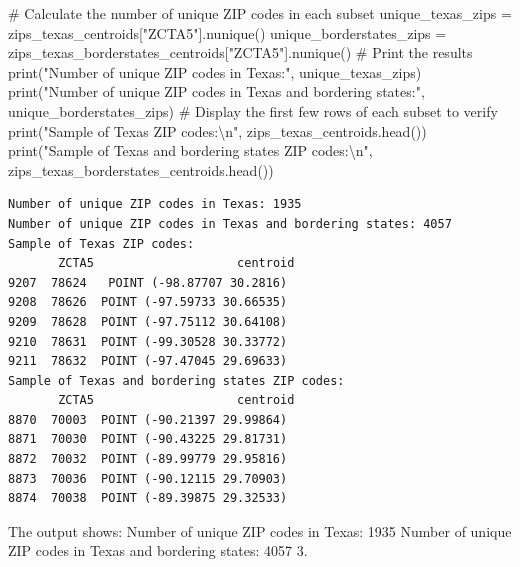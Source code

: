 \documentclass[
  letterpaper,
  DIV=11,
  numbers=noendperiod]{scrartcl}
\newenvironment{Shaded}{\begin{snugshade}}{\end{snugshade}}
\newcommand{\BuiltInTok}[1]{\textcolor[rgb]{0.00,0.23,0.31}{#1}}
\newcommand{\CharTok}[1]{\textcolor[rgb]{0.13,0.47,0.30}{#1}}
\newcommand{\CommentTok}[1]{\textcolor[rgb]{0.37,0.37,0.37}{#1}}
\newcommand{\NormalTok}[1]{\textcolor[rgb]{0.00,0.23,0.31}{#1}}
\newcommand{\OperatorTok}[1]{\textcolor[rgb]{0.37,0.37,0.37}{#1}}
\newcommand{\StringTok}[1]{\textcolor[rgb]{0.13,0.47,0.30}{#1}}
\begin{document}
\begin{Shaded}
\begin{Highlighting}[]
\CommentTok{\# Calculate the number of unique ZIP codes in each subset}
\NormalTok{unique\_texas\_zips }\OperatorTok{=}\NormalTok{ zips\_texas\_centroids[}\StringTok{"ZCTA5"}\NormalTok{].nunique()}
\NormalTok{unique\_borderstates\_zips }\OperatorTok{=}\NormalTok{ zips\_texas\_borderstates\_centroids[}\StringTok{"ZCTA5"}\NormalTok{].nunique()}
\CommentTok{\# Print the results}
\BuiltInTok{print}\NormalTok{(}\StringTok{"Number of unique ZIP codes in Texas:"}\NormalTok{, unique\_texas\_zips)}
\BuiltInTok{print}\NormalTok{(}\StringTok{"Number of unique ZIP codes in Texas and bordering states:"}\NormalTok{, unique\_borderstates\_zips)}
\CommentTok{\# Display the first few rows of each subset to verify}
\BuiltInTok{print}\NormalTok{(}\StringTok{"Sample of Texas ZIP codes:}\CharTok{\textbackslash{}n}\StringTok{"}\NormalTok{, zips\_texas\_centroids.head())}
\BuiltInTok{print}\NormalTok{(}\StringTok{"Sample of Texas and bordering states ZIP codes:}\CharTok{\textbackslash{}n}\StringTok{"}\NormalTok{, zips\_texas\_borderstates\_centroids.head())}
\end{Highlighting}
\end{Shaded}

\begin{verbatim}
Number of unique ZIP codes in Texas: 1935
Number of unique ZIP codes in Texas and bordering states: 4057
Sample of Texas ZIP codes:
       ZCTA5                    centroid
9207  78624   POINT (-98.87707 30.2816)
9208  78626  POINT (-97.59733 30.66535)
9209  78628  POINT (-97.75112 30.64108)
9210  78631  POINT (-99.30528 30.33772)
9211  78632  POINT (-97.47045 29.69633)
Sample of Texas and bordering states ZIP codes:
       ZCTA5                    centroid
8870  70003  POINT (-90.21397 29.99864)
8871  70030  POINT (-90.43225 29.81731)
8872  70032  POINT (-89.99779 29.95816)
8873  70036  POINT (-90.12115 29.70903)
8874  70038  POINT (-89.39875 29.32533)
\end{verbatim}

The output shows: Number of unique ZIP codes in Texas: 1935 Number of
unique ZIP codes in Texas and bordering states: 4057 3.
\end{document}
